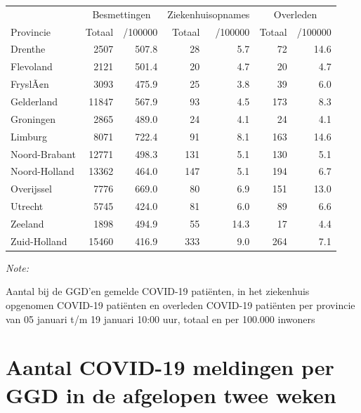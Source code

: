 \documentclass[
  english,
  man,floatsintext]{apa6}
\begin{document}
\begin{table}[H]
\centering
\begin{threeparttable}
\begin{tabular}{lrrrrrr}
\toprule
\multicolumn{1}{c}{ } & \multicolumn{2}{c}{Besmettingen} & \multicolumn{2}{c}{Ziekenhuisopnames} & \multicolumn{2}{c}{Overleden} \\
\cmidrule(l{3pt}r{3pt}){2-3} \cmidrule(l{3pt}r{3pt}){4-5} \cmidrule(l{3pt}r{3pt}){6-7}
Provincie & Totaal & /100000 & Totaal & /100000 & Totaal & /100000\\
\midrule
Drenthe & 2507 & 507.8 & 28 & 5.7 & 72 & 14.6\\
Flevoland & 2121 & 501.4 & 20 & 4.7 & 20 & 4.7\\
FryslÃ¢n & 3093 & 475.9 & 25 & 3.8 & 39 & 6.0\\
Gelderland & 11847 & 567.9 & 93 & 4.5 & 173 & 8.3\\
Groningen & 2865 & 489.0 & 24 & 4.1 & 24 & 4.1\\
Limburg & 8071 & 722.4 & 91 & 8.1 & 163 & 14.6\\
Noord-Brabant & 12771 & 498.3 & 131 & 5.1 & 130 & 5.1\\
Noord-Holland & 13362 & 464.0 & 147 & 5.1 & 194 & 6.7\\
Overijssel & 7776 & 669.0 & 80 & 6.9 & 151 & 13.0\\
Utrecht & 5745 & 424.0 & 81 & 6.0 & 89 & 6.6\\
Zeeland & 1898 & 494.9 & 55 & 14.3 & 17 & 4.4\\
Zuid-Holland & 15460 & 416.9 & 333 & 9.0 & 264 & 7.1\\
\bottomrule
\end{tabular}
\begin{tablenotes}
\item \textit{Note: } 
\item Aantal bij de GGD’en gemelde COVID-19 patiënten, in het ziekenhuis opgenomen COVID-19 patiënten en overleden COVID-19 patiënten per provincie van 05 januari t/m 19 januari 10:00 uur, totaal en per 100.000 inwoners
\end{tablenotes}
\end{threeparttable}
\end{table}

\newpage

\hypertarget{aantal-covid-19-meldingen-per-ggd-in-de-afgelopen-twee-weken}{%
\section{Aantal COVID-19 meldingen per GGD in de afgelopen twee weken}\label{aantal-covid-19-meldingen-per-ggd-in-de-afgelopen-twee-weken}}
\end{document}
